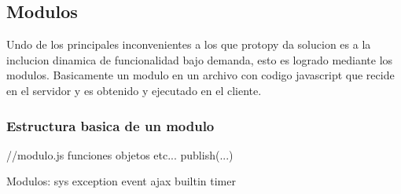 \subsection*{Modulos}
Undo de los principales inconvenientes a los que protopy da solucion es a la inclucion dinamica de funcionalidad bajo demanda,
esto es logrado mediante los modulos.
Basicamente un modulo en un archivo con codigo javascript que recide en el servidor y es obtenido y ejecutado en el cliente.

\subsubsection*{Estructura basica de un modulo}
	//modulo.js
	funciones
	objetos
	etc...
	publish(...)

Modulos:
	sys
	exception
	event
	ajax
	builtin
	timer